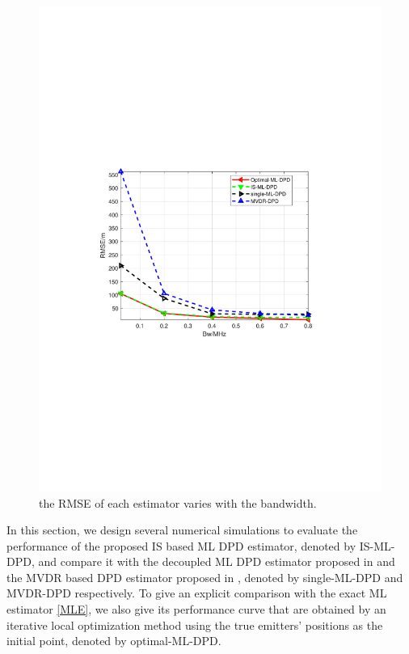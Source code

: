 \documentclass[review]{elsarticle}
\begin{document}
\begin{figure}[!t]
    \centerline{\includegraphics[width=1\textwidth]{pdfFigures/BWvsRMSE(snr5dBL10).pdf}}
    \centering
	\caption{the RMSE of each estimator varies with the bandwidth.}\label{fig6}
\end{figure}
In this section, we design several numerical simulations to evaluate the performance of the proposed IS based ML DPD estimator, denoted by IS-ML-DPD, and compare it with the decoupled ML DPD estimator proposed in \cite{DPD2005} and the MVDR based DPD estimator proposed in \cite{Tirer2015High}, denoted by single-ML-DPD and MVDR-DPD respectively. To give an explicit comparison with the exact ML estimator \eqref{MLE}, we also give its performance curve that are obtained by an iterative local optimization method using the true emitters' positions as the initial point, denoted by optimal-ML-DPD.
\end{document}
